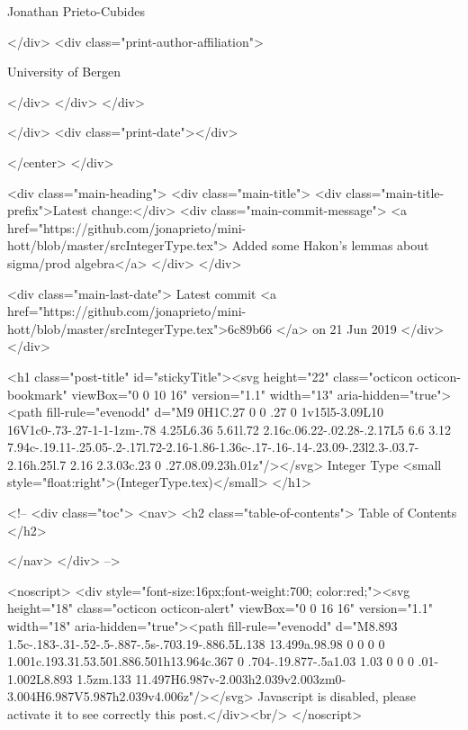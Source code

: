                   Jonathan Prieto-Cubides
                
              </div>
              <div class="print-author-affiliation">
                
                  University of Bergen
                
                </div>
            </div>
          </div>
          
          
        </div>
        <div class="print-date"></div>
        
        
    </center>
  </div>

  
  <div class="main-heading">
    <div class="main-title">
      <div class="main-title-prefix">Latest change:</div>
      <div class="main-commit-message">
            <a href="https://github.com/jonaprieto/mini-hott/blob/master/srcIntegerType.tex">
              Added some Hakon's lemmas about sigma/prod algebra</a>
      </div>
    </div>

    <div class="main-last-date">
      Latest commit <a href="https://github.com/jonaprieto/mini-hott/blob/master/srcIntegerType.tex">6c89b66 </a> on  21 Jun 2019
    </div>
  </div>
  

  <h1 class="post-title" id="stickyTitle"><svg height="22" class="octicon octicon-bookmark" viewBox="0 0 10 16" version="1.1" width="13" aria-hidden="true"><path fill-rule="evenodd" d="M9 0H1C.27 0 0 .27 0 1v15l5-3.09L10 16V1c0-.73-.27-1-1-1zm-.78 4.25L6.36 5.61l.72 2.16c.06.22-.02.28-.2.17L5 6.6 3.12 7.94c-.19.11-.25.05-.2-.17l.72-2.16-1.86-1.36c-.17-.16-.14-.23.09-.23l2.3-.03.7-2.16h.25l.7 2.16 2.3.03c.23 0 .27.08.09.23h.01z"/></svg> Integer Type <small style="float:right">(IntegerType.tex)</small>
  </h1>

  <!-- 
  <div class="toc">
    <nav>
    <h2 class="table-of-contents"> Table of Contents </h2>
      

    </nav>
  </div>
   -->

  <noscript>
  <div style="font-size:16px;font-weight:700; color:red;"><svg height="18" class="octicon octicon-alert" viewBox="0 0 16 16" version="1.1" width="18" aria-hidden="true"><path fill-rule="evenodd" d="M8.893 1.5c-.183-.31-.52-.5-.887-.5s-.703.19-.886.5L.138 13.499a.98.98 0 0 0 0 1.001c.193.31.53.501.886.501h13.964c.367 0 .704-.19.877-.5a1.03 1.03 0 0 0 .01-1.002L8.893 1.5zm.133 11.497H6.987v-2.003h2.039v2.003zm0-3.004H6.987V5.987h2.039v4.006z"/></svg> Javascript is disabled, please activate it to see correctly this post.</div><br/>
  </noscript>

